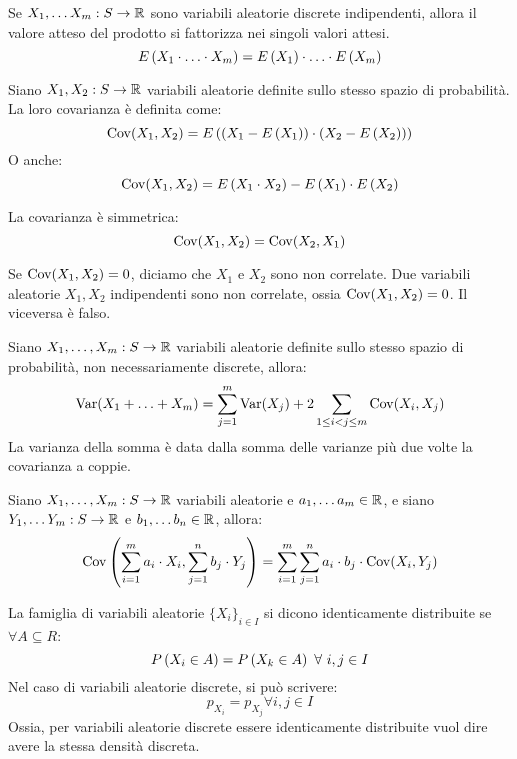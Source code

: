 \begin{prop}
Se $X_1, \ldots X_m : S \to \mathbb{R}$ sono variabili aleatorie discrete indipendenti, allora il valore atteso del prodotto si fattorizza nei singoli valori attesi.
\[
E \left( X_1 \cdot \ldots \cdot X_m \right) = E \left( X_1 \right) \cdot \ldots \cdot E \left( X_m \right)
\]
\end{prop}

\begin{defn}
Siano $X_1, X_2 : S \to \mathbb{R}$ variabili aleatorie definite sullo stesso spazio di probabilit\`a. La loro covarianza \`e definita come:
\[
\operatorname{Cov} (X_1, X_2) = E \left(  \left( X_1 - E \left( X_1 \right) \right) \cdot \left( X_2 - E \left( X_2 \right) \right)  \right)
\]
O anche:
\[
\operatorname{Cov}(X_1,X_2) = E \left( X_1 \cdot X_2 \right) - E \left( X_1 \right) \cdot E \left( X_2 \right)
\]
\end{defn}
La covarianza \`e simmetrica:
\[
\operatorname{Cov}(X_1, X_2) = \operatorname{Cov} (X_2,X_1)
\]

\begin{defn}
Se $\operatorname{Cov}(X_1,X_2) = 0$, diciamo che $X_1$ e $X_2$ sono non correlate. Due variabili aleatorie $X_1, X_2$ indipendenti sono non correlate, ossia $\operatorname{Cov} (X_1, X_2) = 0$. Il viceversa \`e falso.
\end{defn}

\begin{prop}
Siano $X_1, \ldots, X_m : S \to \mathbb{R}$ variabili aleatorie definite sullo stesso spazio di probabilit\`a, non necessariamente discrete, allora:
\[
\operatorname{Var} (X_1 + \ldots + X_m) = 
\sum_{j = 1}^{m} \operatorname{Var} (X_j) + 2 \sum_{1 \le i < j \le m} \operatorname{Cov} (X_i, X_j)
\]
La varianza della somma \`e data dalla somma delle varianze pi\`u due volte la covarianza a coppie.
\end{prop}

\begin{prop}
Siano $X_1, \ldots, X_m : S \to \mathbb{R}$ variabili aleatorie e $a_1, \ldots a_m \in \mathbb{R}$, e siano $Y_1, \ldots Y_m : S \to \mathbb{R}$ e $b_1, \ldots b_n \in \mathbb{R}$, allora:
\[
\operatorname{Cov} \left( \sum_{i = 1}^{m} a_i \cdot X_i, \sum_{j = 1}^{n} b_j \cdot Y_j \right) = 
\sum_{i = 1}^{m} \sum_{j = 1}^{n} a_i \cdot b_j \cdot \operatorname{Cov} (X_i, Y_j)
\]
\end{prop}

\begin{defn}
La famiglia di variabili aleatorie $\{X_i\}_{i \in I}$ si dicono identicamente distribuite se $\forall A \subseteq R$:
\[
\prob{X_i \in A} = \prob{X_k \in A} \forall i, j \in I
\]
Nel caso di variabili aleatorie discrete, si pu\`o scrivere:
\[
p_{X_i} = p_{X_j} \forall i, j \in I
\]
Ossia, per variabili aleatorie discrete essere identicamente distribuite vuol dire avere la stessa densit\`a discreta.
\end{defn}

